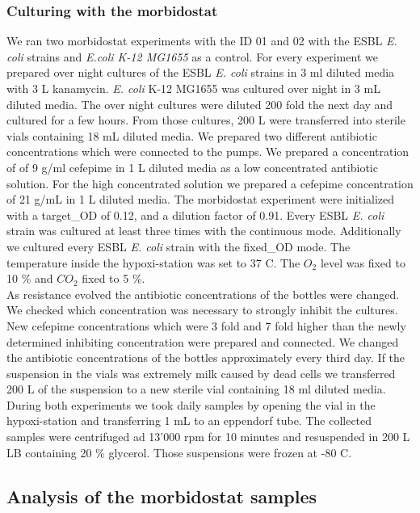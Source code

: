 \subsubsection{Culturing with the morbidostat}
We ran two morbidostat experiments with the ID 01 and 02 with the ESBL \textit{E. coli} strains and \textit{E.coli K-12 MG1655} as a control. For every experiment we prepared over night cultures of the ESBL \textit{E. coli} strains in 3 ml diluted media with 3 \textmu L kanamycin. \textit{E. coli} K-12 MG1655 was cultured over night in 3 mL diluted media. The over night cultures were diluted 200 fold the next day and cultured for a few hours. From those cultures, 200 \textmu L were transferred into sterile vials containing 18 mL diluted media. We prepared two different antibiotic concentrations which were connected to the pumps. We prepared a concentration of of 9 \textmu g/ml cefepime in 1 L diluted media as a low concentrated antibiotic solution. For the high concentrated solution we prepared a cefepime concentration of 21 \textmu g/mL in 1 L diluted media. The morbidostat experiment were initialized with a target\_OD of 0.12, and a dilution factor of 0.91. Every ESBL \textit{E. coli} strain was cultured at least three times with the continuous mode. Additionally we cultured every ESBL \textit{E. coli} strain with the fixed\_OD mode. The temperature inside the hypoxi-station was set to 37 \degree C. The $O_2$ level was fixed to 10 \% and $CO_2$ fixed to 5 \%. \\
As resistance evolved the antibiotic concentrations of the bottles were changed. We checked which concentration was necessary to strongly inhibit the cultures. New cefepime concentrations which were 3 fold and 7 fold higher than the newly determined inhibiting concentration were prepared and connected. We changed the antibiotic concentrations of the bottles approximately every third day. If the suspension in the vials was extremely milk caused by dead cells we transferred 200 \textmu L of the suspension to a new sterile vial containing 18 ml diluted media.  \\
During both experiments we took daily samples by opening the vial in the hypoxi-station and transferring 1 mL to an eppendorf tube. The collected samples were centrifuged ad 13'000 rpm for 10 minutes and resuspended in 200 \textmu L LB containing 20 \% glycerol. Those suspensions were frozen at -80 \degree C.\\

\subsection{Analysis of the morbidostat samples}
